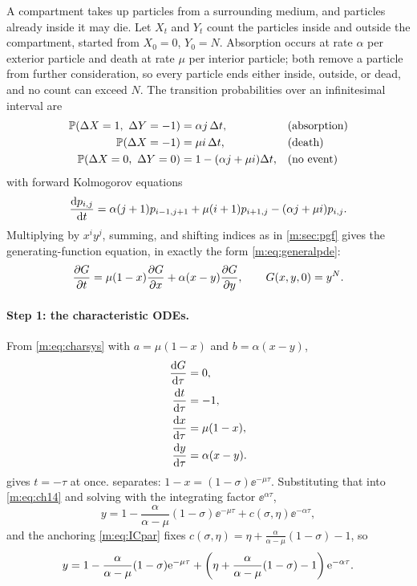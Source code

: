 A compartment takes up particles from a surrounding medium, and particles
already inside it may die. Let $X_t$ and $Y_t$ count the particles inside and
outside the compartment, started from $X_0=0$, $Y_0=N$. Absorption occurs at
rate $\alpha$ per exterior particle and death at rate $\mu$ per interior
particle; both remove a particle from further consideration, so every particle
ends either inside, outside, or dead, and no count can exceed $N$. The
transition probabilities over an infinitesimal interval are
\begin{align*}
\mathbb{P}\!\left(\Delta X = 1,\ \Delta Y = -1\right) &= \alpha j\,\Delta t, &&\text{(absorption)}\\
\mathbb{P}\!\left(\Delta X = -1\right) &= \mu i\,\Delta t, &&\text{(death)}\\
\mathbb{P}\!\left(\Delta X = 0,\ \Delta Y = 0\right) &= 1-(\alpha j+\mu i)\Delta t, &&\text{(no event)}
\end{align*}
with forward Kolmogorov equations
\begin{equation}
\label{m:eq:FK2}
\frac{\mathrm{d} p_{i,j}}{\mathrm{d} t} = \alpha(j+1)p_{i-1,j+1} + \mu(i+1)p_{i+1,j} - (\alpha j+\mu i)p_{i,j} .
\end{equation}
Multiplying by $x^iy^j$, summing, and shifting indices as in \cref{m:sec:pgf}
gives the generating-function equation, in exactly the form
\cref{m:eq:generalpde}:
\begin{equation}
\label{m:eq:PDE2}
\frac{\partial G}{\partial t} = \mu(1-x)\frac{\partial G}{\partial x} + \alpha(x-y)\frac{\partial G}{\partial y},
\qquad G(x,y,0) = y^N .
\end{equation}

\paragraph{Step 1: the characteristic ODEs.}
From \cref{m:eq:charsys} with $a=\mu(1-x)$ and $b=\alpha(x-y)$,
\begin{align}
\frac{\mathrm{d} G}{\mathrm{d} \tau} &= 0, \label{m:eq:ch11}\\
\frac{\mathrm{d} t}{\mathrm{d} \tau} &= -1, \label{m:eq:ch12}\\
\frac{\mathrm{d} x}{\mathrm{d} \tau} &= \mu(1-x), \label{m:eq:ch13}\\
\frac{\mathrm{d} y}{\mathrm{d} \tau} &= \alpha(x-y). \label{m:eq:ch14}
\end{align}
 gives $t=-\tau$ at once.  separates:
$1-x = (1-\sigma)\ee^{-\mu\tau}$. Substituting that into \cref{m:eq:ch14} and
solving with the integrating factor $\ee^{\alpha\tau}$,
\begin{equation*}
y = 1-\frac{\alpha}{\alpha-\mu}(1-\sigma)\ee^{-\mu\tau}
+ c(\sigma,\eta)\ee^{-\alpha\tau},
\end{equation*}
and the anchoring \cref{m:eq:ICpar} fixes
$c(\sigma,\eta) = \eta + \frac{\alpha}{\alpha-\mu}(1-\sigma)-1$, so
\begin{equation}
\label{m:eq:ywitheta}
y = 1-\frac{\alpha}{\alpha-\mu}(1-\sigma)\mathrm{e}^{-\mu\tau}
+ \left(\eta + \frac{\alpha}{\alpha-\mu}(1-\sigma)-1\right)\mathrm{e}^{-\alpha\tau} .
\end{equation}

